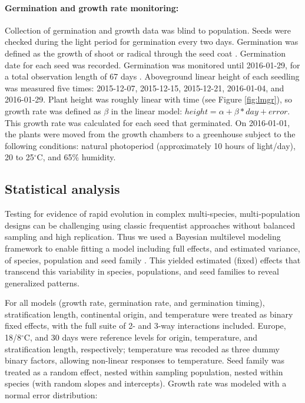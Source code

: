 \documentclass[12pt]{article}\usepackage[]{graphicx}\usepackage[]{color}
\begin{document}
	\paragraph{Germination and growth rate monitoring:}  Collection of germination and growth data was blind to population. Seeds were checked during the light period for germination every two days. Germination was defined as the growth of shoot or radical through the seed coat \parencite{Baskin1998,Popay1970}. Germination date for each seed was recorded.  Germination was monitored until 2016-01-29, for a total observation length of 67 days  \parencite[this is longer than the typical two-week germination trials according to][]{Baskin1998,Wulff1994}. Aboveground linear height of each seedling was measured five times: 2015-12-07, 2015-12-15, 2015-12-21, 2016-01-04, and 2016-01-29. Plant height was roughly linear with time (see Figure \ref{fig:lmgr}), so growth rate was defined as $\beta$ in the linear model: $height = \alpha + \beta*day + error $. This growth rate was calculated for each seed that germinated. On 2016-01-01, the plants were moved from the growth chambers to a greenhouse subject to the following conditions: natural photoperiod (approximately 10 hours of light/day), 20 to 25$^\circ$C, and 65\% humidity.
	\subsection{Statistical analysis} 
	Testing for evidence of rapid evolution in complex multi-species, multi-population designs can be challenging using classic frequentist approaches without balanced sampling and high replication. Thus we used a Bayesian multilevel modeling framework to enable fitting a model including full effects, and estimated variance, of species, population and seed family \parencite{Carpenter2017}. This yielded estimated (fixed) effects that transcend this variability in species, populations, and seed families to reveal generalized patterns. 

For all models (growth rate, germination rate, and germination timing), stratification length, continental origin, and temperature were treated as binary fixed effects, with the full suite of 2- and 3-way interactions included. Europe, 18/8$^\circ$C, and 30 days were reference levels for origin, temperature, and stratification length, respectively; temperature was recoded as three dummy binary factors, allowing non-linear responses to temperature. Seed family was treated as a random effect, nested within sampling population, nested within species (with random slopes and intercepts). Growth rate was modeled with a normal error distribution: 
\end{document}
